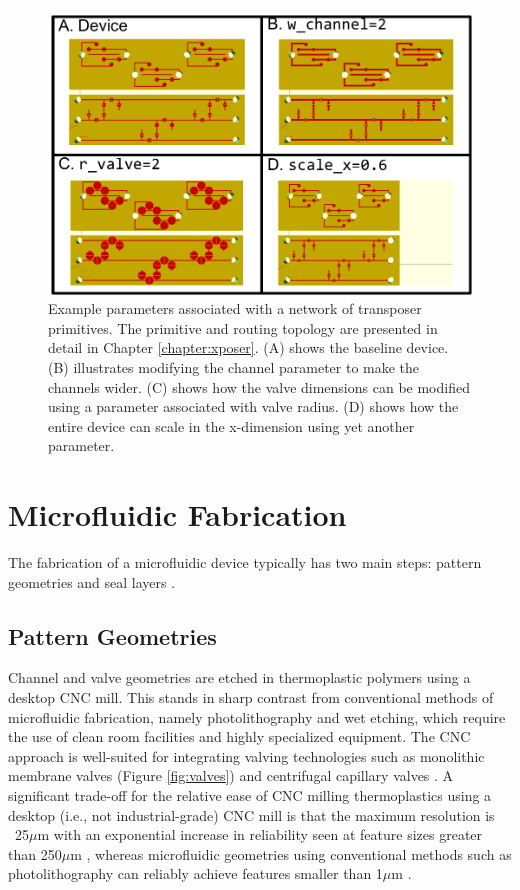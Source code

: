 \begin{figure}[h]
  \begin{minipage}[t]{0.99\linewidth}\centering
    \includegraphics[width=14cm]{params.pdf}
    \medskip
  \end{minipage}\hfill
  \caption[Example device parameters]{Example parameters associated with a network of transposer primitives. The primitive and routing topology are presented in detail in Chapter \ref{chapter:xposer}. (A) shows the baseline device. (B) illustrates modifying the channel parameter to make the channels wider. (C) shows how the valve dimensions can be modified using a parameter associated with valve radius. (D) shows how the entire device can scale in the x-dimension using yet another parameter.}
    \label{fig:mfParams}
\end{figure}

\section{Microfluidic Fabrication}
\label{sec:mfFabrication}
The fabrication of a microfluidic device typically has two main steps: pattern geometries and seal layers \cite{mcdonald2002poly}.

\subsection{Pattern Geometries}
Channel and valve geometries are etched in thermoplastic polymers using a desktop CNC mill. This stands in sharp contrast from conventional methods of microfluidic fabrication, namely photolithography and wet etching, which require the use of clean room facilities and highly specialized equipment. The CNC approach is well-suited for integrating valving technologies such as monolithic membrane valves \cite{grover2003monolithic} (Figure \ref{fig:valves}) and centrifugal capillary valves \cite{madou1998labcd}. A significant trade-off for the relative ease of CNC milling thermoplastics using a desktop (i.e., not industrial-grade) CNC mill is that the maximum resolution is ~25$\mu$m with an exponential increase in reliability seen at feature sizes greater than 250$\mu$m \cite{guckenberger2015micromilling}, whereas microfluidic geometries using conventional methods such as photolithography can reliably achieve features smaller than 1$\mu$m \cite{mcdonald2002poly}.

